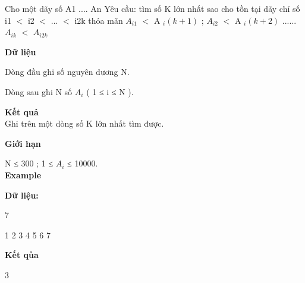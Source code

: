 



     Cho một  dãy số A1 .... An Yêu cầu: tìm số K lớn nhất sao cho tồn tại dãy chỉ số i1 $<$ i2 $<$ ... $<$ i2k thỏa mãn $A_{i1}$     $<$ A     $_      i( k + 1 )     $     ; $A_{i2}$     $<$ A     $_      i( k + 2 )     $     ...... $A_{ik}$     $<$ $A_{i2k}$

\textbf{      Dữ liệu     }

     Dòng đầu ghi số nguyên dương N.    

     Dòng sau ghi N số $A_{i}$     ( 1 ≤ i ≤ N ).    

\textbf{       Kết quả      }
\\

     Ghi trên một dòng số K lớn nhất tìm được.    

\textbf{      Giới hạn     }

     N ≤ 300 ; 1 ≤ $A_{i}$     ≤ 10000.     
\\

\textbf{      Example     }

\textbf{      Dữ liệu:     }

     7    

     1 2 3 4 5 6 7    

\textbf{      Kết qủa     }

     3    
